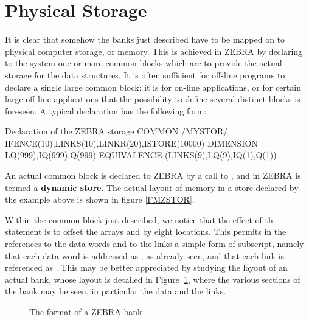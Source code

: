 \section{Physical Storage}

It is clear that somehow the banks just described have to be mapped on
to physical computer storage, or memory.
This is achieved in ZEBRA by declaring to the system one or more common
blocks which are to provide the actual storage for the data structures.
It is often sufficient for off-line programs to declare a single large
common block; it is for on-line applications, or for certain large
off-line applications that the possibility to define several distinct
blocks is foreseen. A typical declaration has the following form:
\begin{XMPt}{Declaration of the ZEBRA storage}
      COMMON /MYSTOR/ IFENCE(10),LINKS(10),LINKR(20),ISTORE(10000)
      DIMENSION     LQ(999),IQ(999),Q(999)
      EQUIVALENCE  (LINKS(9),LQ(9),IQ(1),Q(1))
\end{XMPt}
An actual common block is declared to ZEBRA by a call to ,
and in ZEBRA is termed a {\bf dynamic store}.
The actual layout of memory in a store declared by the example above is shown
in figure \ref{FMZSTOR}.

\begin{Fighere}
\begin{center}
\mbox{}
\end{center}
\caption{The layout of the ZEBRA default store}
\label{FMZSTOR}
\end{Fighere}

Within the common block just described, we notice that the effect of th
 statement is to offset the arrays  and 
 by eight locations. 
This permits in the references to the data words and to the
links a simple form of subscript, namely that each data word is
addressed as , 
as already seen, and that each link is referenced as . 
This may be better appreciated by studying the layout of an
actual bank, whose layout is detailed in Figure~\ref{BNKFORM},
where the various sections of the bank may be seen, in particular the
data and the links.

\begin{figure}[p]
\begin{center}
\mbox{}
\end{center}
\caption{The format of a ZEBRA bank}
\label{BNKFORM}
\end{figure}

